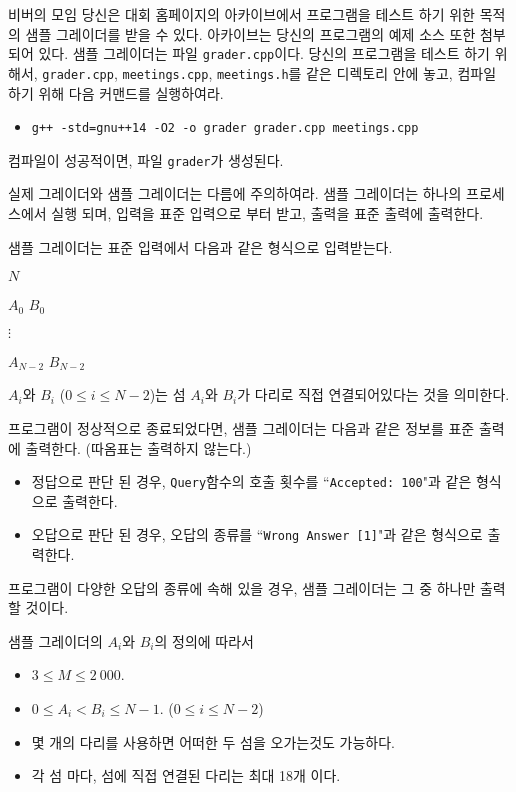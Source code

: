 \begin{problem}{비버의 모임}
	당신은 대회 홈페이지의 아카이브에서 프로그램을 테스트 하기 위한 목적의 샘플 그레이더를 받을 수 있다. 아카이브는 당신의 프로그램의 예제 소스 또한 첨부되어 있다.
	샘플 그레이더는 파일 \texttt{grader.cpp}이다. 당신의 프로그램을 테스트 하기 위해서, \texttt{grader.cpp}, \texttt{meetings.cpp}, \texttt{meetings.h}를 같은 디렉토리 안에 놓고, 컴파일 하기 위해 다음 커맨드를 실행하여라.
	
	\begin{itemize}
		\item \texttt{g++ -std=gnu++14 -O2 -o grader grader.cpp meetings.cpp}
	\end{itemize}
	
	컴파일이 성공적이면, 파일 \texttt{grader}가 생성된다.
	
	실제 그레이더와 샘플 그레이더는 다름에 주의하여라. 샘플 그레이더는 하나의 프로세스에서 실행 되며, 입력을 표준 입력으로 부터 받고, 출력을 표준 출력에 출력한다.
	
	\InputFile
	
	샘플 그레이더는 표준 입력에서 다음과 같은 형식으로 입력받는다.
	
	$N$
	
	$A_0$ $B_0$
	
	$\vdots$
	
	$A_{N-2}$ $B_{N-2}$
	
	$A_i$와 $B_i$ ($0 \le i \le N-2$)는 섬 $A_i$와 $B_i$가 다리로 직접 연결되어있다는 것을 의미한다.
	
	\OutputFile
	
	프로그램이 정상적으로 종료되었다면, 샘플 그레이더는 다음과 같은 정보를 표준 출력에 출력한다. (따옴표는 출력하지 않는다.)
	
	\begin{itemize}
		\item 정답으로 판단 된 경우, \texttt{Query}함수의 호출 횟수를 ``\texttt{Accepted: 100}"과 같은 형식으로 출력한다.
		\item 오답으로 판단 된 경우, 오답의 종류를 ``\texttt{Wrong Answer [1]}"과 같은 형식으로 출력한다.
	\end{itemize}
	
	프로그램이 다양한 오답의 종류에 속해 있을 경우, 샘플 그레이더는 그 중 하나만 출력 할 것이다.
	
	\Constraints
	
	샘플 그레이더의 $A_i$와 $B_i$의 정의에 따라서
	
	\begin{itemize}
		\item $3 \le M \le 2\ 000$.
		\item $0 \le A_i < B_i \le N-1$. ($0 \le i \le N-2$)
		\item 몇 개의 다리를 사용하면 어떠한 두 섬을 오가는것도 가능하다.
		\item 각 섬 마다, 섬에 직접 연결된 다리는 최대 18개 이다.
	\end{itemize}
	

\end{problem}
